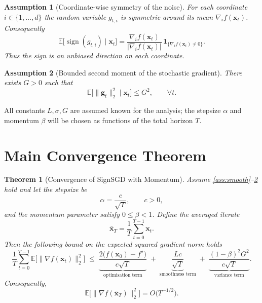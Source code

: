 \documentclass{article}
\newtheorem{theorem}{Theorem}
\newtheorem{assumption}{Assumption}
\newcommand{\sign}{\operatorname{sign}}
\newcommand{\E}{\mathbb{E}}
\begin{document}
\begin{assumption}[Coordinate‑wise symmetry of the noise]
\label{ass:sym}
For each coordinate $i\in\{1,\dots,d\}$ the random variable
$g_{t,i}$ is symmetric around its mean $\nabla_{i}f(\bm{x}_{t})$.
Consequently
\[
\E\!\big[\sign(g_{t,i})\mid \bm{x}_{t}\big]
= \frac{\nabla_{i}f(\bm{x}_{t})}{\big|\nabla_{i}f(\bm{x}_{t})\big|}\,
\mathbf{1}_{\{\nabla_{i}f(\bm{x}_{t})\neq0\}} .
\tag{A4}
\]
Thus the sign is an \emph{unbiased direction} on each coordinate.
\end{assumption}

\begin{assumption}[Bounded second moment of the stochastic gradient]
\label{ass:second}
There exists $G>0$ such that
\[
\E\!\big[\|\bm{g}_{t}\|_{2}^{2}\mid \bm{x}_{t}\big]\le G^{2},
\qquad\forall t.
\tag{A5}
\]
\end{assumption}

All constants $L,\sigma,G$ are assumed known for the analysis; the stepsize $\alpha$ and momentum $\beta$ will be chosen as functions of the total horizon $T$.

\section*{Main Convergence Theorem}
\begin{theorem}[Convergence of SignSGD with Momentum]\label{thm:main}
Assume \ref{ass:smooth}–\ref{ass:second} hold and let the stepsize be
\[
\alpha = \frac{c}{\sqrt{T}},\qquad c>0,
\tag{3}
\]
and the momentum parameter satisfy $0\le\beta<1$.
Define the averaged iterate
\[
\bar{\bm{x}}_{T}= \frac{1}{T}\sum_{t=0}^{T-1}\bm{x}_{t}.
\]
Then the following bound on the expected squared gradient norm holds
\[
\frac{1}{T}\sum_{t=0}^{T-1}\E\!\big[\|\nabla f(\bm{x}_{t})\|_{2}^{2}\big]
\;\le\;
\underbrace{\frac{2\big(f(\bm{x}_{0})-f^{\star}\big)}{c\sqrt{T}}}_{\text{optimisation term}}
\;+\;
\underbrace{\frac{L c}{\sqrt{T}}}_{\text{smoothness term}}
\;+\;
\underbrace{\frac{(1-\beta)^{2}G^{2}}{c\sqrt{T}}}_{\text{variance term}} .
\tag{4}
\]
Consequently,
\[
\E\!\big[\|\nabla f(\bar{\bm{x}}_{T})\|_{2}^{2}\big]=O\!\big(T^{-1/2}\big).
\]
\end{theorem}
\end{document}
